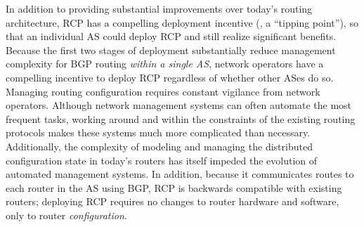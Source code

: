 In addition to providing substantial improvements over today's routing
architecture, RCP has a compelling deployment incentive (\ie, a
``tipping point''), so that an individual AS could deploy RCP and
still realize significant benefits.  Because the first two stages of
deployment substantially reduce management complexity for BGP routing
{\em within a single AS\/}, network operators have a compelling
incentive to deploy RCP regardless of whether other ASes do so.
Managing routing configuration requires constant vigilance from
network operators.  Although network management systems can often
automate the most frequent tasks, working around and within the
constraints of the existing routing protocols makes these systems much
more complicated than necessary.  Additionally, the complexity of
modeling and managing the distributed configuration state in today's
routers has itself impeded the evolution of automated management
systems.  
In addition, because it communicates routes to each router in the
AS using BGP, RCP is backwards compatible with existing routers; deploying
RCP requires no changes to router hardware and software, only to
router {\em configuration}.

